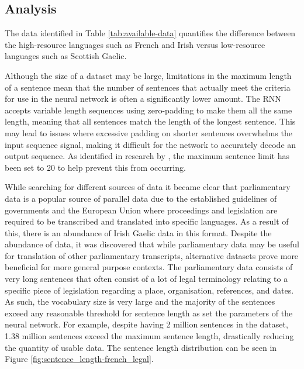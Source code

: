 \subsection{Analysis}

The data identified in Table \ref{tab:available-data} quantifies the difference between the high-resource languages such as French and Irish versus low-resource languages such as Scottish Gaelic. 



Although the size of a dataset may be large, limitations in the maximum length of a sentence mean that the number of sentences that actually meet the criteria for use in the neural network is often a significantly lower amount. The RNN accepts variable length sequences using zero-padding to make them all the same length, meaning that all sentences match the length of the longest sentence. This may lead to issues where excessive padding on shorter sentences overwhelms the input sequence signal, making it difficult for the network to accurately decode an output sequence. As identified in research by \cite{cho_properties_2014}, the maximum sentence limit has been set to 20 to help prevent this from occurring.

While searching for different sources of data it became clear that parliamentary data is a popular source of parallel data due to the established guidelines of governments and the European Union where proceedings and legislation are required to be transcribed and translated into specific languages. As a result of this, there is an abundance of Irish Gaelic data in this format. Despite the abundance of data, it was discovered that while parliamentary data may be useful for translation of other parliamentary transcripts, alternative datasets prove more beneficial for more general purpose contexts. The parliamentary data consists of very long sentences that often consist of a lot of legal terminology relating to a specific piece of legislation regarding a place, organisation, references, and dates. 
As such, the vocabulary size is very large and the majority of the sentences exceed any reasonable threshold for sentence length as set the parameters of the neural network. For example, despite having 2 million sentences in the \cite{french_corpus_2005} dataset, 1.38 million sentences exceed the maximum sentence length, drastically reducing the quantity of usable data. The sentence length distribution can be seen in Figure \ref{fig:sentence_length-french_legal}.

